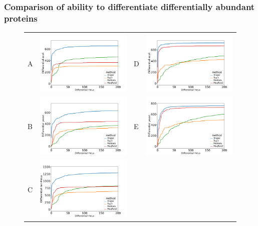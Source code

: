 \documentclass[11pt]{article}
\begin{document}
\subsubsection*{Comparison of ability to differentiate differentially abundant proteins}
\begin{figure}[hbt]
    \centering
    \begin{tabular}{lclc} 
        A & \includegraphics[width=0.4\linewidth]{../../result/report_plots_pipeline/diff_HeLa_vs_nonHeLa_ID_ecoli.png} & 
        D & \includegraphics[width=0.4\linewidth]{../../result/report_plots_pipeline/diff_HeLa_vs_nonHeLa_PS_ecoli.png} \\ 
        B & \includegraphics[width=0.4\linewidth]{../../result/report_plots_pipeline/diff_HeLa_vs_nonHeLa_ID_yeast.png} & 
        E & \includegraphics[width=0.4\linewidth]{../../result/report_plots_pipeline/diff_HeLa_vs_nonHeLa_PS_yeast.png} \\
        C & \includegraphics[width=0.45\linewidth]{../../result/report_plots_pipeline/diff_HeLa_vs_nonHeLa_ID_all.png} & 

\end{tabular}
\end{figure}
\end{document}
